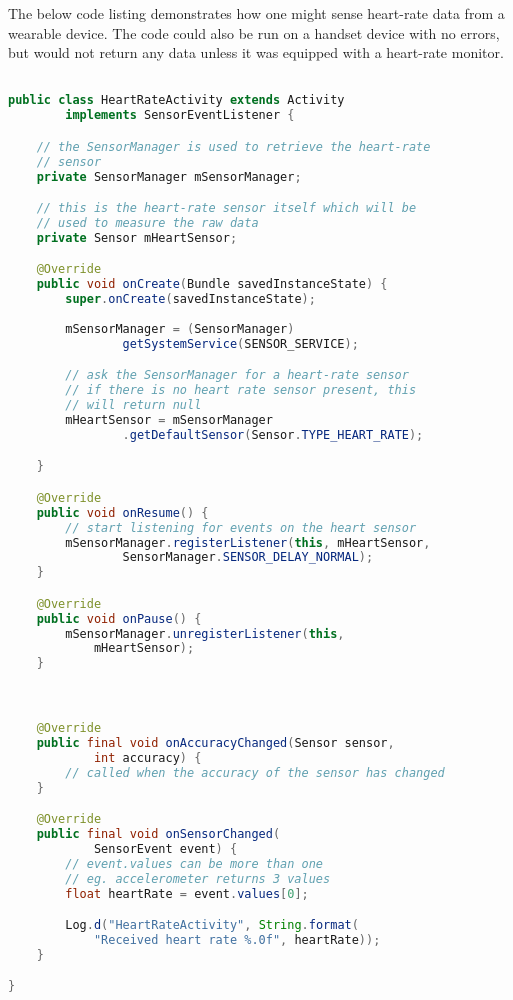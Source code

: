 The below code listing demonstrates how one might sense heart-rate data from
a wearable device. The code could also be run on a handset device with no
errors, but would not return any data unless it was equipped with a heart-rate
monitor.

\begin{lstlisting}[language=Java]

public class HeartRateActivity extends Activity
        implements SensorEventListener {

    // the SensorManager is used to retrieve the heart-rate
    // sensor
    private SensorManager mSensorManager;

    // this is the heart-rate sensor itself which will be
    // used to measure the raw data
    private Sensor mHeartSensor;

    @Override
    public void onCreate(Bundle savedInstanceState) {
        super.onCreate(savedInstanceState);
        
        mSensorManager = (SensorManager)
                getSystemService(SENSOR_SERVICE);

        // ask the SensorManager for a heart-rate sensor
        // if there is no heart rate sensor present, this
        // will return null
        mHeartSensor = mSensorManager
                .getDefaultSensor(Sensor.TYPE_HEART_RATE);

    }

    @Override
    public void onResume() {
        // start listening for events on the heart sensor
        mSensorManager.registerListener(this, mHeartSensor,
                SensorManager.SENSOR_DELAY_NORMAL);
    }

    @Override
    public void onPause() {
        mSensorManager.unregisterListener(this,
            mHeartSensor);
    }



    @Override
    public final void onAccuracyChanged(Sensor sensor,
            int accuracy) {
        // called when the accuracy of the sensor has changed
    }

    @Override
    public final void onSensorChanged(
            SensorEvent event) {
        // event.values can be more than one
        // eg. accelerometer returns 3 values
        float heartRate = event.values[0];

        Log.d("HeartRateActivity", String.format(
            "Received heart rate %.0f", heartRate));
    }

}

\end{lstlisting}

